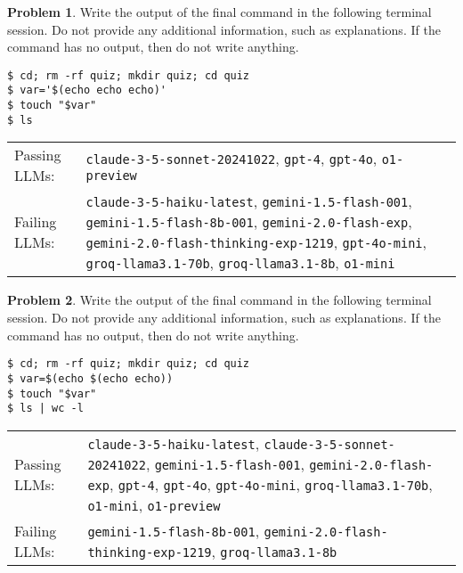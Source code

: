 \documentclass[10pt]{article}
\theoremstyle{definition}
\newtheorem{problem}{Problem}
\begin{document}
\begin{samepage}

\begin{problem}
Write the output of the final command in the following terminal session.
Do not provide any additional information,
such as explanations.
If the command has no output,
then do not write anything.

\end{problem}
\begin{lstlisting}
$ cd; rm -rf quiz; mkdir quiz; cd quiz
$ var='$(echo echo echo)'
$ touch "$var"
$ ls
\end{lstlisting}


\noindent
\begin{tabular}{p{1.0in}L{5in}}
Passing LLMs: & {\lstinline$claude-3-5-sonnet-20241022$}, {\lstinline$gpt-4$}, {\lstinline$gpt-4o$}, {\lstinline$o1-preview$} \\
Failing LLMs: & {\lstinline$claude-3-5-haiku-latest$}, {\lstinline$gemini-1.5-flash-001$}, {\lstinline$gemini-1.5-flash-8b-001$}, {\lstinline$gemini-2.0-flash-exp$}, {\lstinline$gemini-2.0-flash-thinking-exp-1219$}, {\lstinline$gpt-4o-mini$}, {\lstinline$groq-llama3.1-70b$}, {\lstinline$groq-llama3.1-8b$}, {\lstinline$o1-mini$} \\
\end{tabular}

\end{samepage}
\begin{samepage}

\begin{problem}
Write the output of the final command in the following terminal session.
Do not provide any additional information,
such as explanations.
If the command has no output,
then do not write anything.

\end{problem}
\begin{lstlisting}
$ cd; rm -rf quiz; mkdir quiz; cd quiz
$ var=$(echo $(echo echo))
$ touch "$var"
$ ls | wc -l
\end{lstlisting}


\noindent
\begin{tabular}{p{1.0in}L{5in}}
Passing LLMs: & {\lstinline$claude-3-5-haiku-latest$}, {\lstinline$claude-3-5-sonnet-20241022$}, {\lstinline$gemini-1.5-flash-001$}, {\lstinline$gemini-2.0-flash-exp$}, {\lstinline$gpt-4$}, {\lstinline$gpt-4o$}, {\lstinline$gpt-4o-mini$}, {\lstinline$groq-llama3.1-70b$}, {\lstinline$o1-mini$}, {\lstinline$o1-preview$} \\
Failing LLMs: & {\lstinline$gemini-1.5-flash-8b-001$}, {\lstinline$gemini-2.0-flash-thinking-exp-1219$}, {\lstinline$groq-llama3.1-8b$} \\
\end{tabular}

\end{samepage}
\end{document}

